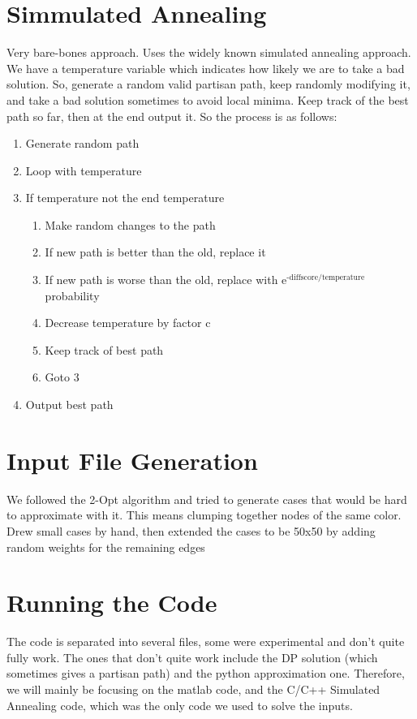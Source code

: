 \documentclass[11pt]{article}
\begin{document}
\section{Simmulated Annealing}
\label{sec-3}
Very bare-bones approach. Uses the widely known simulated annealing approach. We
have a temperature variable which indicates how likely we are to take a bad solution.
So, generate a random valid partisan path, keep randomly modifying it, and take a bad
solution sometimes to avoid local minima. Keep track of the best path so far, then at the
end output it. So the process is as follows:\\
\begin{enumerate}
\item Generate random path
\item Loop with temperature
\item If temperature not the end temperature
\begin{enumerate}
\item Make random changes to the path
\item If new path is better than the old, replace it
\item If new path is worse than the old, replace with e$^{\text{-diffscore/temperature}}$ probability
\item Decrease temperature by factor c
\item Keep track of best path
\item Goto 3
\end{enumerate}
\item Output best path
\end{enumerate}

\newpage

\section{Input File Generation}
\label{sec-4}
We followed the 2-Opt algorithm and tried to generate cases
that would be hard to approximate with it. This means clumping together
nodes of the same color. Drew small cases by hand, then extended the cases
to be 50x50 by adding random weights for the remaining edges

\newpage

\section{Running the Code}
\label{sec-5}
The code is separated into several files, some were experimental and don't quite
fully work. The ones that don't quite work include the DP solution (which sometimes
gives a partisan path) and the python approximation one. Therefore, we will mainly
be focusing on the matlab code, and the C/C++ Simulated Annealing code, which was
the only code we used to solve the inputs.
\end{document}
